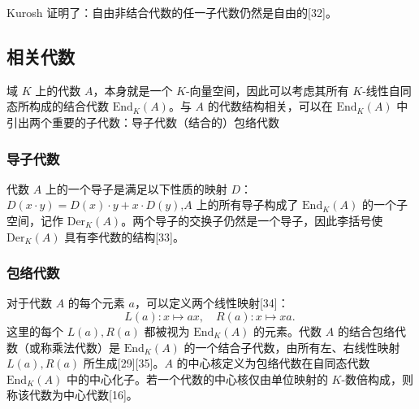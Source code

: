 Kurosh 证明了：自由非结合代数的任一子代数仍然是自由的[32]。
\subsection{相关代数}
域 $K$ 上的代数 $A$，本身就是一个 $K$-向量空间，因此可以考虑其所有 $K$-线性自同态所构成的结合代数 $\mathrm{End}_K(A)$。与 $A$ 的代数结构相关，可以在 $\mathrm{End}_K(A)$ 中引出两个重要的子代数：导子代数（结合的）包络代数
\subsubsection{导子代数}
代数 $A$ 上的一个导子是满足以下性质的映射 $D$：$D(x \cdot y) = D(x) \cdot y + x \cdot D(y)$,$A$ 上的所有导子构成了 $\mathrm{End}_K(A)$ 的一个子空间，记作 $\mathrm{Der}_K(A)$。两个导子的交换子仍然是一个导子，因此李括号使 $\mathrm{Der}_K(A)$ 具有李代数的结构[33]。
\subsubsection{包络代数}
对于代数 $A$ 的每个元素 $a$，可以定义两个线性映射[34]：
$$
L(a): x \mapsto ax ,\quad R(a): x \mapsto xa.~
$$
这里的每个 $L(a), R(a)$ 都被视为 $\mathrm{End}_K(A)$ 的元素。代数 $A$ 的结合包络代数（或称乘法代数）是 $\mathrm{End}_K(A)$ 的一个结合子代数，由所有左、右线性映射 $L(a), R(a)$ 所生成[29][35]。$A$ 的中心核定义为包络代数在自同态代数 $\mathrm{End}_K(A)$ 中的中心化子。若一个代数的中心核仅由单位映射的 $K$-数倍构成，则称该代数为中心代数[16]。
